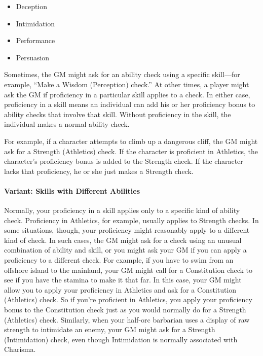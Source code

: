 \documentclass[
]{article}
\providecommand{\tightlist}{%
  \setlength{\itemsep}{0pt}\setlength{\parskip}{0pt}}
\begin{document}
\begin{itemize}
\tightlist
\item
  Deception
\item
  Intimidation
\item
  Performance
\item
  Persuasion
\end{itemize}

Sometimes, the GM might ask for an ability check using a specific
skill---for example, ``Make a Wisdom (Perception) check.'' At other
times, a player might ask the GM if proficiency in a particular skill
applies to a check. In either case, proficiency in a skill means an
individual can add his or her proficiency bonus to ability checks that
involve that skill. Without proficiency in the skill, the individual
makes a normal ability check.

For example, if a character attempts to climb up a dangerous cliff, the
GM might ask for a Strength (Athletics) check. If the character is
proficient in Athletics, the character's proficiency bonus is added to
the Strength check. If the character lacks that proficiency, he or she
just makes a Strength check.

\hypertarget{variant-skills-with-different-abilities}{%
\paragraph{Variant: Skills with Different
Abilities}\label{variant-skills-with-different-abilities}}

Normally, your proficiency in a skill applies only to a specific kind of
ability check. Proficiency in Athletics, for example, usually applies to
Strength checks. In some situations, though, your proficiency might
reasonably apply to a different kind of check. In such cases, the GM
might ask for a check using an unusual combination of ability and skill,
or you might ask your GM if you can apply a proficiency to a different
check. For example, if you have to swim from an offshore island to the
mainland, your GM might call for a Constitution check to see if you have
the stamina to make it that far. In this case, your GM might allow you
to apply your proficiency in Athletics and ask for a Constitution
(Athletics) check. So if you're proficient in Athletics, you apply your
proficiency bonus to the Constitution check just as you would normally
do for a Strength (Athletics) check. Similarly, when your half-orc
barbarian uses a display of raw strength to intimidate an enemy, your GM
might ask for a Strength (Intimidation) check, even though Intimidation
is normally associated with Charisma.
\end{document}
